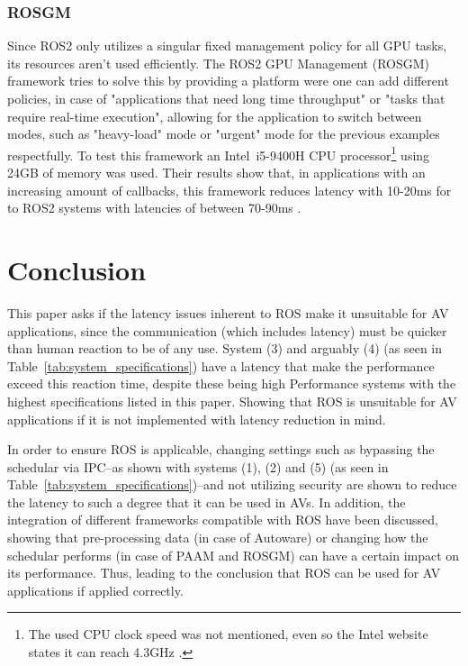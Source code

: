 \documentclass[conference,a4paper]{IEEEtran}
\begin{document}
\subsubsection{ROSGM}
Since ROS2 only utilizes a singular fixed management policy for all GPU tasks, its resources aren't used efficiently.
The ROS2 GPU Management (ROSGM) framework tries to solve this by providing a platform were one can add different policies, in case of "applications that need long time throughput" or "tasks that require \mbox{real-time} execution", allowing for the application to switch between modes, such as \mbox{"heavy-load"} mode or "urgent" mode for the previous examples respectfully.
To test this framework an \mbox{Intel i5-9400H} CPU processor\footnote{The used CPU clock speed was not mentioned, even so the Intel website states it can reach 4.3GHz \cite{intelProcessor}.} using 24GB of memory was used.
Their results show that, in applications with an increasing amount of callbacks, this framework reduces latency with \mbox{10-20ms} for to ROS2 systems with latencies of between \mbox{70-90ms} \cite{Wei2016}.

\setlength{\parskip}{0em}
\setlength{\parindent}{0pt}
\section{Conclusion}

\setlength{\parskip}{0em}
\setlength{\parindent}{10pt}
This paper asks if the latency issues inherent to ROS make it unsuitable for AV applications, since the communication (which includes latency) must be quicker than human reaction to be of any use.
System (3) and arguably (4) (as seen in Table~\ref{tab:system_specifications}) have a latency that make the performance exceed this reaction time, despite these being high Performance systems with the highest specifications listed in this paper. 
Showing that ROS is unsuitable for AV applications if it is not implemented with latency reduction in mind.

\setlength{\parskip}{1em}
\setlength{\parindent}{10pt}
In order to ensure ROS is applicable, changing settings such as bypassing the schedular via IPC--as shown with systems (1), (2) and (5) (as seen in Table~\ref{tab:system_specifications})--and not utilizing security are shown to reduce the latency to such a degree that it can be used in AVs. 
In addition, the integration of different frameworks compatible with ROS have been discussed, showing that \mbox{pre-processing} data (in case of Autoware) or changing how the schedular performs (in case of PAAM and ROSGM) can have a certain impact on its performance.
Thus, leading to the conclusion that ROS can be used for AV applications if applied correctly.

\setlength{\parskip}{1em}
\setlength{\parindent}{0pt}


\setlength{\parskip}{0em}
\setlength{\parindent}{0pt}

\end{document}
